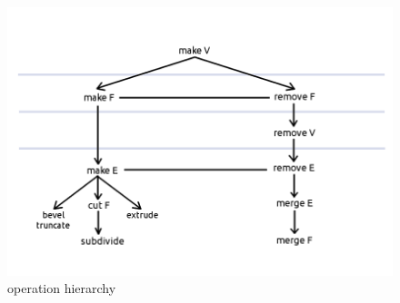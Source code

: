 \documentclass{article}
\begin{document}
\begin{figure}[!h]
\includegraphics[scale=0.5]{hierarchy.png}
\caption{operation hierarchy}
\end{figure}
%

\newpage
\end{document}
